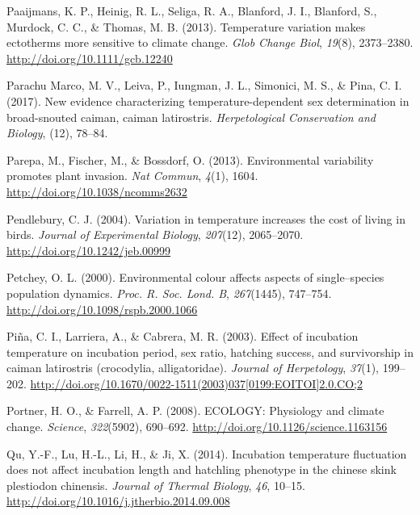 \documentclass[12pt,twoside]{reedthesis}
\begin{document}
\leavevmode\hypertarget{ref-paaijmans_temperature_2013}{}%
Paaijmans, K. P., Heinig, R. L., Seliga, R. A., Blanford, J. I., Blanford, S., Murdock, C. C., \& Thomas, M. B. (2013). Temperature variation makes ectotherms more sensitive to climate change. \emph{Glob Change Biol}, \emph{19}(8), 2373--2380. \url{http://doi.org/10.1111/gcb.12240}

\leavevmode\hypertarget{ref-parachu_marco_new_2017}{}%
Parachu Marco, M. V., Leiva, P., Iungman, J. L., Simonici, M. S., \& Pina, C. I. (2017). New evidence characterizing temperature-dependent sex determination in broad-snouted caiman, caiman latirostris. \emph{Herpetological Conservation and Biology}, (12), 78--84.

\leavevmode\hypertarget{ref-parepa_environmental_2013}{}%
Parepa, M., Fischer, M., \& Bossdorf, O. (2013). Environmental variability promotes plant invasion. \emph{Nat Commun}, \emph{4}(1), 1604. \url{http://doi.org/10.1038/ncomms2632}

\leavevmode\hypertarget{ref-pendlebury_variation_2004-1}{}%
Pendlebury, C. J. (2004). Variation in temperature increases the cost of living in birds. \emph{Journal of Experimental Biology}, \emph{207}(12), 2065--2070. \url{http://doi.org/10.1242/jeb.00999}

\leavevmode\hypertarget{ref-petchey_environmental_2000}{}%
Petchey, O. L. (2000). Environmental colour affects aspects of single--species population dynamics. \emph{Proc. R. Soc. Lond. B}, \emph{267}(1445), 747--754. \url{http://doi.org/10.1098/rspb.2000.1066}

\leavevmode\hypertarget{ref-pina_effect_2003}{}%
Piña, C. I., Larriera, A., \& Cabrera, M. R. (2003). Effect of incubation temperature on incubation period, sex ratio, hatching success, and survivorship in caiman latirostris (crocodylia, alligatoridae). \emph{Journal of Herpetology}, \emph{37}(1), 199--202. \href{http://doi.org/10.1670/0022-1511(2003)037\%5B0199:EOITOI\%5D2.0.CO;2}{http://doi.org/10.1670/0022-1511(2003)037{[}0199:EOITOI{]}2.0.CO;2}

\leavevmode\hypertarget{ref-portner_ecology_2008}{}%
Portner, H. O., \& Farrell, A. P. (2008). ECOLOGY: Physiology and climate change. \emph{Science}, \emph{322}(5902), 690--692. \url{http://doi.org/10.1126/science.1163156}

\leavevmode\hypertarget{ref-qu_incubation_2014}{}%
Qu, Y.-F., Lu, H.-L., Li, H., \& Ji, X. (2014). Incubation temperature fluctuation does not affect incubation length and hatchling phenotype in the chinese skink plestiodon chinensis. \emph{Journal of Thermal Biology}, \emph{46}, 10--15. \url{http://doi.org/10.1016/j.jtherbio.2014.09.008}
\end{document}
